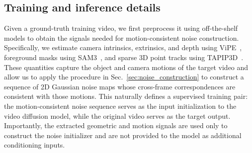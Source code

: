 

\subsection{Training and inference details}
\label{sec:details}
Given a ground-truth training video, we first preprocess it using off-the-shelf models to obtain the signals needed for motion-consistent noise construction. Specifically, we estimate camera intrinsics, extrinsics, and depth using ViPE~\citep{huang2025vipe}, foreground masks using SAM3~\citep{carion2025sam3segmentconcepts}, and sparse 3D point tracks using TAPIP3D~\citep{tapip3d}. These quantities capture the object and camera motions of the target video and allow us to apply the procedure in Sec.~\ref{sec:noise_construction} to construct a sequence of 2D Gaussian noise maps whose cross-frame correspondences are consistent with those motions. This naturally defines a supervised training pair: the motion-consistent noise sequence serves as the input initialization to the video diffusion model, while the original video serves as the target output. Importantly, the extracted geometric and motion signals are used only to construct the noise initializer and are not provided to the model as additional conditioning inputs.


